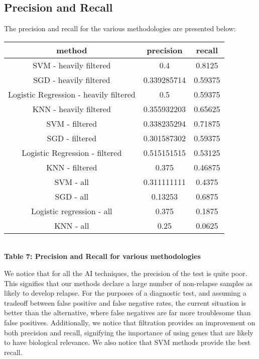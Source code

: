 \documentclass[12pt]{scrartcl}
\begin{document}
    \subsection{Precision and Recall}
    The precision and recall for the various methodologies are presented below:
    \begin{center}
    \begin{tabular}{|c|c|c|}
    \hline
    method & precision & recall\\
    \hline
    SVM - heavily filtered & 0.4 & 0.8125\\
    SGD - heavily filtered & 0.339285714 & 0.59375\\
    Logistic Regression - heavily filtered & 0.5 & 0.59375\\
    KNN - heavily filtered & 0.355932203 & 0.65625\\
    SVM - filtered & 0.338235294 & 0.71875\\
    SGD - filtered & 0.301587302    & 0.59375\\
    Logistic Regression - filtered & 0.515151515 & 0.53125\\
    KNN - filtered & 0.375 & 0.46875\\
    SVM - all & 0.311111111 & 0.4375\\
    SGD - all & 0.13253 & 0.6875\\
    Logistic regression - all & 0.375 & 0.1875\\
    KNN - all & 0.25 & 0.0625\\
    
    \hline
    \end{tabular}\\
    \vspace{0.1in}
    \textbf{Table 7: Precision and Recall for various methodologies}  
    \end{center}
    
    We notice that for all the AI techniques, the precision of the test is quite poor. This signifies that our methods declare a large number of non-relapse samples as likely to develop relapse. For the purposes of a diagnostic test, and assuming a tradeoff between false positive and false negative rates, the current situation is better than the alternative, where false negatives are far more troublesome than false positives. Additionally, we notice that filtration provides an improvement on both precision and recall, signifying the importance of using genes that are likely to have biological relevance. We also notice that SVM methods provide the best recall.
    
\end{document}
